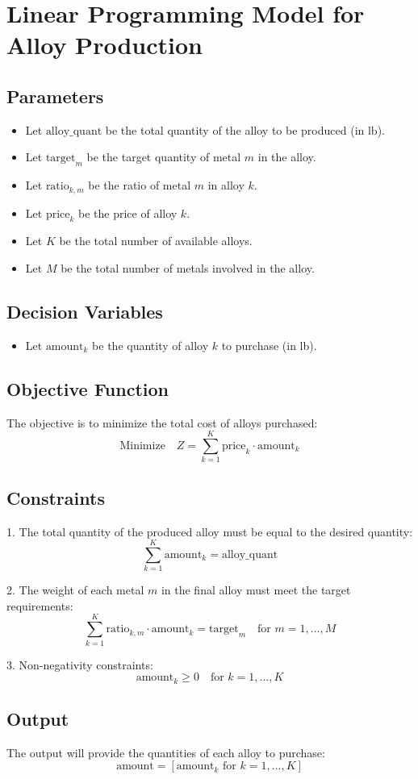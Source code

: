 \documentclass{article}
\begin{document}
\section*{Linear Programming Model for Alloy Production}

\subsection*{Parameters}
\begin{itemize}
    \item Let \( \text{alloy\_quant} \) be the total quantity of the alloy to be produced (in lb).
    \item Let \( \text{target}_{m} \) be the target quantity of metal \( m \) in the alloy.
    \item Let \( \text{ratio}_{k, m} \) be the ratio of metal \( m \) in alloy \( k \).
    \item Let \( \text{price}_{k} \) be the price of alloy \( k \).
    \item Let \( K \) be the total number of available alloys.
    \item Let \( M \) be the total number of metals involved in the alloy.
\end{itemize}

\subsection*{Decision Variables}
\begin{itemize}
    \item Let \( \text{amount}_{k} \) be the quantity of alloy \( k \) to purchase (in lb).
\end{itemize}

\subsection*{Objective Function}
The objective is to minimize the total cost of alloys purchased:
\[
\text{Minimize} \quad Z = \sum_{k=1}^{K} \text{price}_{k} \cdot \text{amount}_{k}
\]

\subsection*{Constraints}
1. The total quantity of the produced alloy must be equal to the desired quantity:
\[
\sum_{k=1}^{K} \text{amount}_{k} = \text{alloy\_quant}
\]

2. The weight of each metal \( m \) in the final alloy must meet the target requirements:
\[
\sum_{k=1}^{K} \text{ratio}_{k, m} \cdot \text{amount}_{k} = \text{target}_{m} \quad \text{for } m = 1, \ldots, M
\]

3. Non-negativity constraints:
\[
\text{amount}_{k} \geq 0 \quad \text{for } k = 1, \ldots, K
\]

\subsection*{Output}
The output will provide the quantities of each alloy to purchase:
\[
\text{amount} = [\text{amount}_{k} \text{ for } k = 1, \ldots, K]
\]
\end{document}
